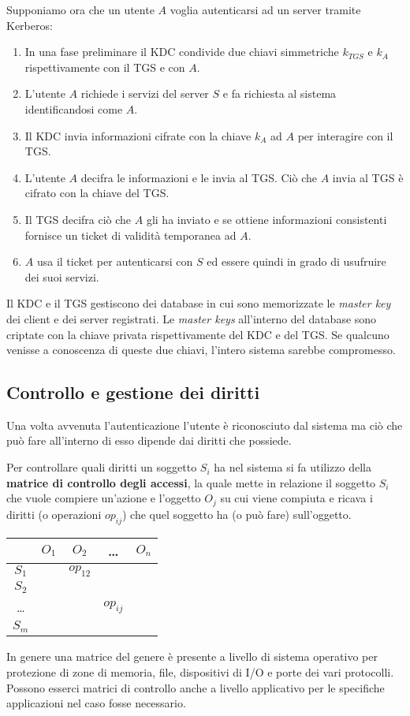 Supponiamo ora che un utente $A$ voglia autenticarsi ad un server tramite Kerberos:
\begin{enumerate}
	\item In una fase preliminare il KDC condivide due chiavi simmetriche $k_{TGS}$ e $k_A$ rispettivamente con il TGS
	      e con $A$.
	\item L'utente $A$ richiede i servizi del server $S$ e fa richiesta al sistema identificandosi come $A$.
	\item Il KDC invia informazioni cifrate con la chiave $k_A$ ad $A$ per interagire con il TGS.
	\item L'utente $A$ decifra le informazioni e le invia al TGS. Ciò che $A$ invia al TGS è cifrato con la chiave
	      del TGS.
	\item Il TGS decifra ciò che $A$ gli ha inviato e se ottiene informazioni consistenti fornisce un ticket di
	      validità temporanea ad $A$.
	\item $A$ usa il ticket per autenticarsi con $S$ ed essere quindi in grado di usufruire dei suoi servizi.
\end{enumerate}
Il KDC e il TGS gestiscono dei database in cui sono memorizzate le \emph{master key} dei client e dei server registrati.
Le \emph{master keys} all'interno del database sono criptate con la chiave privata rispettivamente del KDC e del TGS.
Se qualcuno venisse a conoscenza di queste due chiavi, l'intero sistema sarebbe compromesso.

\subsection{Controllo e gestione dei diritti}
Una volta avvenuta l'autenticazione l'utente è riconosciuto dal sistema ma ciò che può fare all'interno di esso dipende
dai diritti che possiede.

Per controllare quali diritti un soggetto $S_i$ ha nel sistema si fa utilizzo della \textbf{matrice di controllo degli
	accessi}, la quale mette in relazione il soggetto $S_i$ che vuole compiere un'azione e l'oggetto $O_j$ su cui viene
compiuta e ricava i diritti (o operazioni $op_{ij}$) che quel soggetto ha (o può fare) sull'oggetto.
\begin{center}
	\begin{tabular}{ c | c | c | c | c |}
		      & $O_1$ & $O_2$     & \dots     & $O_n$ \\
		\hline
		$S_1$ &       & $op_{12}$ &           &       \\
		\hline
		$S_2$ &       &           &           &       \\
		\hline
		\dots &       &           & $op_{ij}$ &       \\
		\hline
		$S_m$ &       &           &           &       \\
		\hline
	\end{tabular}
\end{center}
In genere una matrice del genere è presente a livello di sistema operativo per protezione di zone di memoria, file,
dispositivi di I/O e porte dei vari protocolli. Possono esserci matrici di controllo anche a livello applicativo per
le specifiche applicazioni nel caso fosse necessario.

